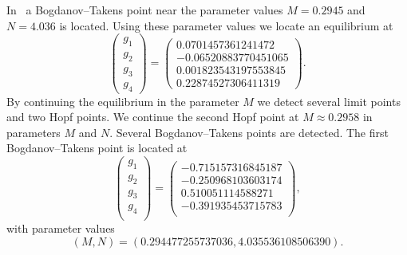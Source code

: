 In~\cite{Jepsen2021HomoclinicRG} a Bogdanov--Takens point near the parameter values
$M=0.2945$ and $N = 4.036$ is located. Using these parameter values we locate an
equilibrium at 
\[
\begin{pmatrix}
    g_1 \\ g_2 \\ g_3 \\ g_4
\end{pmatrix} = 
\begin{pmatrix}
    0.0701457361241472 \\ -0.06520883770451065 \\ 0.001823543197553845 \\ 0.22874527306411319
\end{pmatrix}.
\]
By continuing the equilibrium in the parameter $M$ we detect several limit
points and two Hopf points. We continue the second Hopf point at $M\approx0.2958$ 
in parameters $M$ and $N$. Several Bogdanov--Takens points are detected. The
first Bogdanov--Takens point is located at
\[
\begin{pmatrix}
    g_1 \\ g_2 \\ g_3 \\ g_4 \\ 
\end{pmatrix} = 
\begin{pmatrix}
    -0.715157316845187 \\ -0.250968103603174 \\ 0.510051114588271 \\ -0.391935453715783 \\
\end{pmatrix},
\]
with parameter values
\[
    (M, N) = (0.294477255737036, 4.035536108506390).
\]

